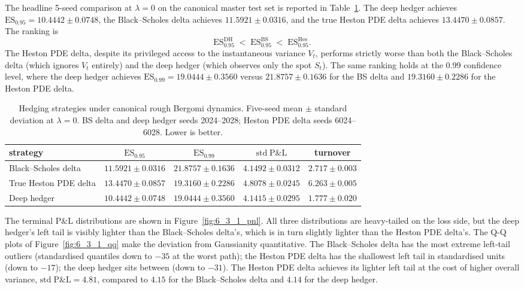 \documentclass[12pt,a4paper]{article}
\theoremstyle{definition}
\theoremstyle{plain}
\theoremstyle{remark}
\theoremstyle{plain}
\begin{document}
The headline 5-seed comparison at $\lambda = 0$ on the canonical master
test set is reported in Table~\ref{tab:6_3_1_headline}. The deep hedger
achieves $\mathrm{ES}_{0.95} = 10.4442 \pm 0.0748$, the Black--Scholes
delta achieves $11.5921 \pm 0.0316$, and the true Heston PDE delta
achieves $13.4470 \pm 0.0857$. The ranking is
\[
  \mathrm{ES}_{0.95}^{\mathrm{DH}} \;<\; \mathrm{ES}_{0.95}^{\mathrm{BS}} \;<\; \mathrm{ES}_{0.95}^{\mathrm{Hes}}.
\]
The Heston PDE delta, despite its privileged access to the
instantaneous variance $V_t$, performs strictly worse than both the
Black--Scholes delta (which ignores $V_t$ entirely) and the deep hedger
(which observes only the spot $S_t$). The same ranking holds at the
$0.99$ confidence level, where the deep hedger achieves $\mathrm{ES}_{0.99}
= 19.0444 \pm 0.3560$ versus $21.8757 \pm 0.1636$ for the BS delta and
$19.3160 \pm 0.2286$ for the Heston PDE delta.

\begin{table}[H]
\centering
\caption{Hedging strategies under canonical rough Bergomi dynamics.
Five-seed mean $\pm$ standard deviation at $\lambda = 0$. BS delta and
deep hedger seeds 2024--2028; Heston PDE delta seeds 6024--6028. Lower
is better.}
\label{tab:6_3_1_headline}
\begin{tabular}{l c c c c}
\toprule
strategy & $\mathrm{ES}_{0.95}$ & $\mathrm{ES}_{0.99}$ & $\mathrm{std\;P\&L}$ & turnover \\
\midrule
Black--Scholes delta    & $11.5921 \pm 0.0316$ & $21.8757 \pm 0.1636$ & $4.1492 \pm 0.0312$ & $2.717 \pm 0.003$ \\
True Heston PDE delta   & $13.4470 \pm 0.0857$ & $19.3160 \pm 0.2286$ & $4.8078 \pm 0.0245$ & $6.263 \pm 0.005$ \\
Deep hedger             & $10.4442 \pm 0.0748$ & $19.0444 \pm 0.3560$ & $4.1415 \pm 0.0295$ & $1.777 \pm 0.020$ \\
\bottomrule
\end{tabular}
\end{table}

The terminal $\mathrm{P\&L}$ distributions are shown in
Figure~\ref{fig:6_3_1_pnl}. All three distributions are heavy-tailed
on the loss side, but the deep hedger's left tail is visibly lighter
than the Black--Scholes delta's, which is in turn slightly lighter than
the Heston PDE delta's. The Q-Q plots of Figure~\ref{fig:6_3_1_qq}
make the deviation from Gaussianity quantitative. The Black--Scholes
delta has the most extreme left-tail outliers (standardised quantiles
down to $-35$ at the worst path); the Heston PDE delta has the
shallowest left tail in standardised units (down to $-17$); the deep
hedger sits between (down to $-31$). The Heston PDE delta achieves
its lighter left tail at the cost of higher overall variance,
$\mathrm{std\;P\&L} = 4.81$, compared to $4.15$ for the Black--Scholes
delta and $4.14$ for the deep hedger.
\end{document}
